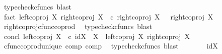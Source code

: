 \begin{isabellebody}
\ {\isacharparenleft}{\kern0pt}typecheck{\isacharunderscore}{\kern0pt}cfuncs{\isacharcomma}{\kern0pt}\ blast{\isacharparenright}{\kern0pt}\isanewline
\ \ \isamarkupfalse%
\ \isamarkupfalse%
\ fact{}{\isacharcolon}{\kern0pt}\ {\isachardoublequoteopen}{\isacharparenleft}{\kern0pt}{\isacharparenleft}{\kern0pt}left{\isacharunderscore}{\kern0pt}coproj\ X\ {\isasymemptyset}{\isacharparenright}{\kern0pt}{\isasymamalg}{\isacharparenleft}{\kern0pt}right{\isacharunderscore}{\kern0pt}coproj\ X\ {\isasymemptyset}{\isacharparenright}{\kern0pt}{\isacharparenright}{\kern0pt}\ {\isasymcirc}\isactrlsub c\ {\isacharparenleft}{\kern0pt}right{\isacharunderscore}{\kern0pt}coproj\ X\ {\isasymemptyset}{\isacharparenright}{\kern0pt}\ {\isacharequal}{\kern0pt}\ right{\isacharunderscore}{\kern0pt}coproj\ X\ {\isasymemptyset}{\isachardoublequoteclose}\isanewline
\ \ \ \ \isamarkupfalse%
\ right{\isacharunderscore}{\kern0pt}coproj{\isacharunderscore}{\kern0pt}cfunc{\isacharunderscore}{\kern0pt}coprod\ \isamarkupfalse%
\ {\isacharparenleft}{\kern0pt}typecheck{\isacharunderscore}{\kern0pt}cfuncs{\isacharcomma}{\kern0pt}\ blast{\isacharparenright}{\kern0pt}\isanewline
\ \ \isamarkupfalse%
\ \isamarkupfalse%
\ concl{\isacharcolon}{\kern0pt}\ {\isachardoublequoteopen}{\isacharparenleft}{\kern0pt}left{\isacharunderscore}{\kern0pt}coproj\ X\ {\isasymemptyset}{\isacharparenright}{\kern0pt}\ {\isasymcirc}\isactrlsub c\ {\isacharparenleft}{\kern0pt}id{\isacharparenleft}{\kern0pt}X{\isacharparenright}{\kern0pt}\ {\isasymamalg}\ {\isasymalpha}\isactrlbsub X\isactrlesub {\isacharparenright}{\kern0pt}\ {\isacharequal}{\kern0pt}\ {\isacharparenleft}{\kern0pt}{\isacharparenleft}{\kern0pt}left{\isacharunderscore}{\kern0pt}coproj\ X\ {\isasymemptyset}{\isacharparenright}{\kern0pt}{\isasymamalg}{\isacharparenleft}{\kern0pt}right{\isacharunderscore}{\kern0pt}coproj\ X\ {\isasymemptyset}{\isacharparenright}{\kern0pt}{\isacharparenright}{\kern0pt}{\isachardoublequoteclose}\isanewline
\ \ \ \ \isamarkupfalse%
\ cfunc{\isacharunderscore}{\kern0pt}coprod{\isacharunderscore}{\kern0pt}unique\ comp{}\ comp{}\ \isamarkupfalse%
\ {\isacharparenleft}{\kern0pt}typecheck{\isacharunderscore}{\kern0pt}cfuncs{\isacharcomma}{\kern0pt}\ blast{\isacharparenright}{\kern0pt}\isanewline
\ \ \isamarkupfalse%
\ \isamarkupfalse%
\ {\isachardoublequoteopen}{\isachardot}{\kern0pt}{\isachardot}{\kern0pt}{\isachardot}{\kern0pt}\ {\isacharequal}{\kern0pt}\ id{\isacharparenleft}{\kern0pt}X{\isasymCoprod}{\isasymemptyset}{\isacharparenright}{\kern0pt}{\isachardoublequoteclose}\isanewline

\end{isabellebody}

